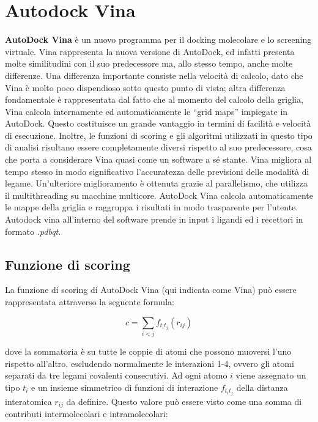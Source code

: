 \section{Autodock Vina}\label{sec:2.4}
\textbf{AutoDock Vina} è  un nuovo programma per il docking molecolare e lo screening virtuale. Vina rappresenta la nuova versione di AutoDock, ed infatti presenta molte similitudini con il suo predecessore ma, allo stesso tempo, anche molte differenze. Una differenza importante consiste nella velocità di calcolo, dato che Vina è molto poco dispendioso sotto questo punto di vista; altra differenza fondamentale è rappresentata dal fatto che al momento del calcolo della griglia, Vina calcola internamente ed automaticamente le “grid maps” impiegate in AutoDock. Questo costituisce un grande vantaggio in termini di facilità e velocità di esecuzione. Inoltre, le funzioni di scoring e gli algoritmi utilizzati in questo tipo di analisi risultano essere completamente diversi rispetto al suo predecessore, cosa che porta a considerare Vina quasi come un software a sé stante. Vina migliora al tempo stesso in modo significativo l'accuratezza delle previsioni delle modalità di legame. Un'ulteriore miglioramento è ottenuta grazie al parallelismo, che utilizza il multithreading su macchine multicore. AutoDock Vina calcola automaticamente le mappe della griglia e raggruppa i risultati in modo trasparente per l'utente. Autodock vina all'interno del software prende in input i ligandi ed i recettori in formato \textit{.pdbqt}.

\subsection{Funzione di scoring}\label{sec:2.4.1}
La funzione di scoring di AutoDock Vina (qui indicata come Vina) può essere rappresentata attraverso la seguente formula:

\begin{equation}
    c = \sum_{i<j}f_{t_it_j}(r_{ij})
\end{equation}

dove la sommatoria è su tutte le coppie di atomi che possono muoversi l'uno rispetto all'altro, escludendo normalmente le interazioni 1-4, ovvero gli atomi separati da tre legami covalenti consecutivi. Ad ogni atomo $i$ viene assegnato un tipo $t_i$ e un insieme simmetrico di funzioni di interazione $f_{t_it_j}$ della distanza interatomica $r_{ij}$ da definire.\newline
Questo valore può essere visto come una somma di contributi intermolecolari e intramolecolari:

